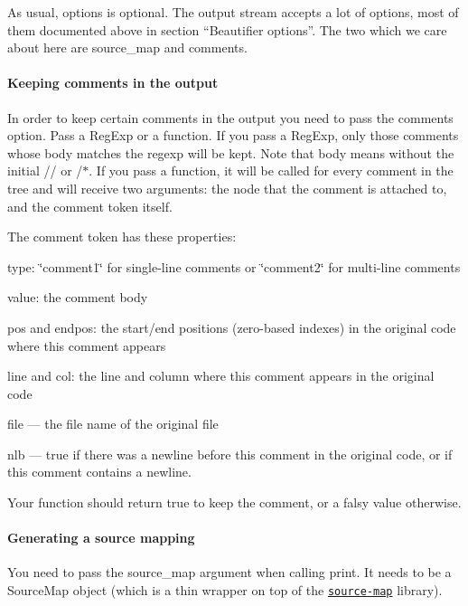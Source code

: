 As usual, {\ttfamily options} is optional. The output stream accepts a lot of options, most of them documented above in section “\+Beautifier options”. The two which we care about here are {\ttfamily source\+\_\+map} and {\ttfamily comments}.

\paragraph*{Keeping comments in the output}

In order to keep certain comments in the output you need to pass the {\ttfamily comments} option. Pass a Reg\+Exp or a function. If you pass a Reg\+Exp, only those comments whose body matches the regexp will be kept. Note that body means without the initial {\ttfamily //} or {\ttfamily /$\ast$}. If you pass a function, it will be called for every comment in the tree and will receive two arguments\+: the node that the comment is attached to, and the comment token itself.

The comment token has these properties\+:


\begin{DoxyItemize}
\item {\ttfamily type}\+: \char`\"{}comment1\char`\"{} for single-\/line comments or \char`\"{}comment2\char`\"{} for multi-\/line comments
\item {\ttfamily value}\+: the comment body
\item {\ttfamily pos} and {\ttfamily endpos}\+: the start/end positions (zero-\/based indexes) in the original code where this comment appears
\item {\ttfamily line} and {\ttfamily col}\+: the line and column where this comment appears in the original code
\item {\ttfamily file} — the file name of the original file
\item {\ttfamily nlb} — true if there was a newline before this comment in the original code, or if this comment contains a newline.
\end{DoxyItemize}

Your function should return {\ttfamily true} to keep the comment, or a falsy value otherwise.

\paragraph*{Generating a source mapping}

You need to pass the {\ttfamily source\+\_\+map} argument when calling {\ttfamily print}. It needs to be a {\ttfamily Source\+Map} object (which is a thin wrapper on top of the \href{https://github.com/mozilla/source-map}{\tt source-\/map} library).

